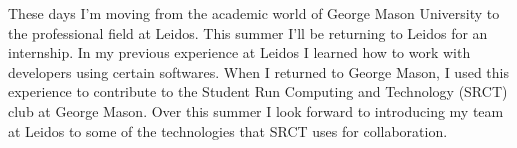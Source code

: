 \documentclass[titlepage]{article}
\begin{document}
These days I'm moving from the academic world of George Mason University to the professional field at Leidos. This summer I'll be returning to Leidos for an internship. In my previous experience at Leidos I learned how to work with developers using certain softwares. When I returned to George Mason, I used this experience to contribute to the Student Run Computing and Technology (SRCT) club at George Mason. Over this summer I look forward to introducing my team at Leidos to some of the technologies that SRCT uses for collaboration.








\begin{singlespace}


\nocite{*}
\end{singlespace}
\end{document}
